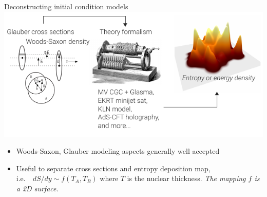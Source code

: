 \documentclass[xcolor=dvipsnames]{beamer}
\begin{document}
\usebackgroundtemplate{}


\begin{frame}{Deconstructing initial condition models}
    \bigskip
    \includegraphics{deconstructing} \\
    \begin{itemize}
        \small
        \item Woods-Saxon, Glauber modeling aspects generally well accepted \\
        \smallskip
        \item Useful to separate cross sections and entropy deposition map, \\
              i.e.\ ~$dS/dy \sim f(T_A, T_B)$ where $T$ is the nuclear thickness.
              \emph{The mapping $f$ is a 2D surface.}
    \end{itemize}
\end{frame}
\end{document}
